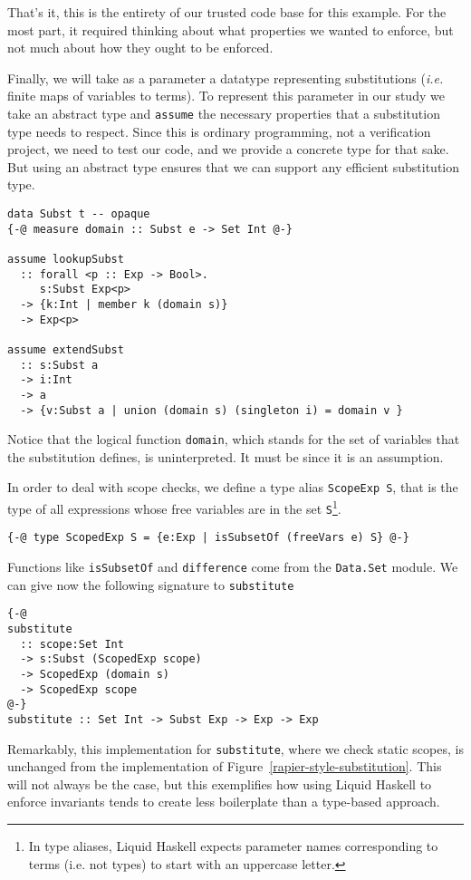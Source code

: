 \documentclass[sigconf, review]{acmart}
\newcommand{\tc}[1]{{\small\texttt{#1}}}
\begin{document}
That's it, this is the entirety of our trusted code base for this example. For
the most part, it required thinking about what properties we wanted to enforce,
but not much about how they ought to be enforced.

Finally, we will take as a parameter a datatype representing substitutions
(\emph{i.e.} finite maps of variables to terms). To represent this parameter in
our study we take an abstract type and \tc{assume} the necessary properties that a
substitution type needs to respect. Since this is ordinary programming, not a
verification project, we need to test our code, and we provide a concrete type
for that sake. But using an abstract type ensures that we can support
any efficient substitution type.

\begin{verbatim}
data Subst t -- opaque
{-@ measure domain :: Subst e -> Set Int @-}

assume lookupSubst
  :: forall <p :: Exp -> Bool>.
     s:Subst Exp<p>
  -> {k:Int | member k (domain s)}
  -> Exp<p>

assume extendSubst
  :: s:Subst a
  -> i:Int
  -> a
  -> {v:Subst a | union (domain s) (singleton i) = domain v }
\end{verbatim}

Notice that the logical function \tc{domain}, which stands for the set of
variables that the substitution defines, is uninterpreted. It must be since it is an
assumption.

In order to deal with scope checks, we define a type alias \tc{ScopeExp S},
that is the type of all
expressions whose free variables are in the set \tc{S}\footnote{In type aliases,
Liquid Haskell expects parameter names corresponding to terms (i.e. not types) to start with
an uppercase letter.}.

\begin{verbatim}
{-@ type ScopedExp S = {e:Exp | isSubsetOf (freeVars e) S} @-}
\end{verbatim}
Functions like \tc{isSubsetOf} and \tc{difference} come from the \tc{Data.\allowbreak Set}
module. We can give now the following signature to \tc{substitute}
\begin{verbatim}
{-@
substitute
  :: scope:Set Int
  -> s:Subst (ScopedExp scope)
  -> ScopedExp (domain s)
  -> ScopedExp scope
@-}
substitute :: Set Int -> Subst Exp -> Exp -> Exp
\end{verbatim}
Remarkably, this implementation for \tc{substitute}, where we check static scopes,
is unchanged from the implementation of
Figure~\ref{rapier-style-substitution}. This will not always be the case, but this
exemplifies how using Liquid Haskell to enforce invariants tends to create less
boilerplate than a type-based approach.
\end{document}
